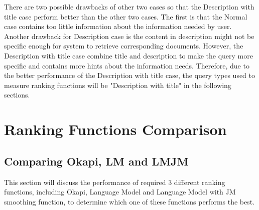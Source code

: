 \documentclass[10pt, a4paper]{article}
\begin{document}
There are two possible drawbacks of other two cases so that the Description with title case perform better than the other two cases. The first is that the Normal case contains too little information about the information needed by user. Another drawback for Description case is the content in description might not be specific enough for system to retrieve corresponding documents. However, the Description with title case combine title and description to make the query more specific and contains more hints about the information needs. Therefore, due to the better performance of the Description with title case, the query types used to measure ranking functions will be "Description with title" in the following sections.

\section{Ranking Functions Comparison}
\label{section:4}
\subsection{Comparing Okapi, LM and LMJM}
This section will discuss the performance of required 3 different ranking functions, including Okapi, Language Model and Language Model with JM smoothing function, to determine which one of these functions performs the best.
\end{document}
